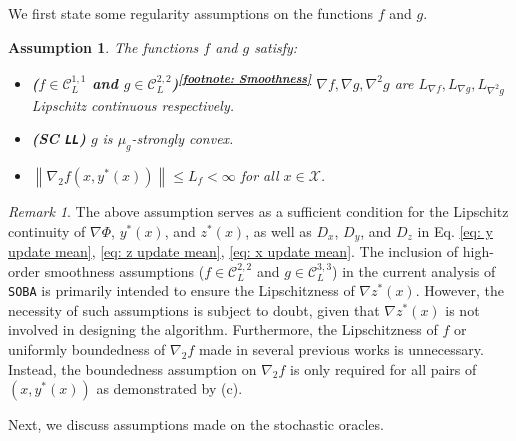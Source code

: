 \documentclass[10pt]{article}
\newcommand{\sref}[1]{\textsuperscript{\ref{#1}}}
\newtheorem{assumption}{Assumption}
\theoremstyle{remark}
\newtheorem*{remark}{Remark}
\newcommand{\cC}{\mathcal{C}}
\newcommand{\cX}{\mathcal{X}}
\newcommand{\norm}[1]{\left\|#1\right\|}
\begin{document}
We first state some regularity assumptions on the functions $f$ and $g$. 
\begin{assumption}\label{aspt: smoothness} The functions $f$ and $g$ satisfy:
\begin{itemize}[leftmargin=2em, itemsep=2pt]
    \item[(a)] \textnormal{\bf ($f\in\cC_L^{1,1}$ and $g\in\cC_L^{2,2}$)\sref{footnote: Smoothness}} $\nabla f, \nabla g, \nabla^2 g$ are $L_{\nabla f}, L_{\nabla g}, L_{\nabla^2 g}$ Lipschitz continuous respectively.
    \item[(b)]  \textnormal{\bf (SC \texttt{LL})} $g$ is $\mu_{g}$-strongly convex.
    \item[(c)] $\norm{\nabla_2 f(x, y^*(x))} \leq L_f < \infty$ for all $x\in\cX$.
\end{itemize}
\end{assumption}
\begin{remark}
    The above assumption serves as a sufficient condition for the Lipschitz continuity of $\nabla \Phi$, $y^*(x)$, and $z^*(x)$, as well as $D_x$, $D_y$, and $D_z$ in Eq. \eqref{eq: y update mean}, \eqref{eq: z update mean}, \eqref{eq: x update mean}. The inclusion of high-order smoothness assumptions ($f\in\cC_L^{2,2}$ and $g\in\cC_L^{3,3}$) in the current analysis of \texttt{SOBA} \cite{dagreou2022framework} is primarily intended to ensure the Lipschitzness of $\nabla z^*(x)$. However, the necessity of such assumptions is subject to doubt, given that $\nabla z^*(x)$ is not involved in designing the algorithm. Furthermore, the Lipschitzness of $f$ or uniformly boundedness of $\nabla_2 f$ made in several previous works is unnecessary. Instead, the boundedness assumption on $\nabla_2 f$ is only required for all pairs of $(x,y^*(x))$ as demonstrated by (c). 
\end{remark}
Next, we discuss assumptions made on the stochastic oracles.
\end{document}
